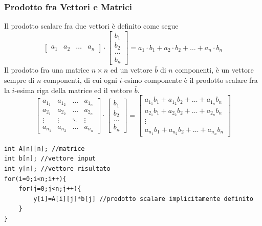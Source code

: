 \documentclass[10pt, letterpaper]{report}
\begin{document}
\subsubsection{Prodotto fra Vettori e Matrici}
Il prodotto scalare fra due vettori è definito come segue 
$$ \begin{bmatrix}
    a_1&a_2&\dots&a_n
\end{bmatrix}\cdot \begin{bmatrix}
    b_1\\b_2\\\dots\\b_n
\end{bmatrix}=a_1\cdot b_1 + a_2\cdot b_2+\dots + a_n\cdot b_n$$
Il prodotto fra una matrice $n\times n$ ed un vettore $\bar b$ di $n$ componenti, è un vettore sempre di 
$n$ componenti, di cui ogni $i$-esimo componente è il prodotto scalare fra la $i$-esima riga della matrice 
ed il vettore $\bar b$. 
$$ \begin{bmatrix}
    a_{1_1}&a_{1_2}&\dots&a_{1_n}\\ 
    a_{2_1}&a_{2_2}&\dots&a_{2_n}\\ 
    \vdots & \vdots &\ddots & \vdots\\ 
    a_{n_1}&a_{n_2}&\dots&a_{n_n}
\end{bmatrix}\cdot \begin{bmatrix}
    b_1\\b_2\\\dots\\b_n
\end{bmatrix}=\begin{bmatrix}
    a_{1_1}b_1+a_{1_2}b_2+\dots+a_{1_n}b_n\\
    a_{2_1}b_1+a_{2_2}b_2+\dots+a_{2_n}b_n\\
    \vdots\\
    a_{n_1}b_1+a_{n_2}b_2+\dots+a_{n_n}b_n
\end{bmatrix}$$
\begin{lstlisting}[style=CStyle]
int A[n][n]; //matrice 
int b[n]; //vettore input
int y[n]; //vettore risultato
for(i=0;i<n;i++){
    for(j=0;j<n;j++){
        y[i]=A[i][j]*b[j] //prodotto scalare implicitamente definito
    }
}
\end{lstlisting}
\end{document}

